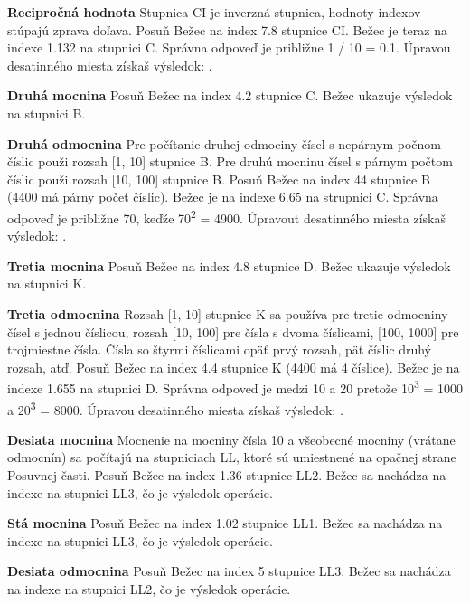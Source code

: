 \begin{multicols*}{3}
{  \textbf{Recipročná hodnota}
\footnotesize Stupnica CI je inverzná stupnica, hodnoty indexov stúpajú zprava doľava. \normalsize
Posuň Bežec na index 7.8 stupnice CI.
Bežec je teraz na indexe 1.132 na stupnici C.
Správna odpoveď je približne 1 / 10 = 0.1. Úpravou desatinného miesta získaš výsledok: .

  \textbf{Druhá mocnina}
Posuň Bežec na index 4.2 stupnice C.
Bežec ukazuje výsledok  na stupnici B.

  \textbf{Druhá odmocnina}
\footnotesize Pre počítanie druhej odmociny čísel s nepárnym počnom číslic použi rozsah [1, 10] stupnice B. Pre druhú mocninu čísel s párnym počtom číslic použi rozsah [10, 100] stupnice B. \normalsize
{}
Posuň Bežec na index 44 stupnice B (4400 má párny počet číslic).
Bežec je na indexe 6.65 na strupnici C. Správna odpoveď je približne 70, keďźe 70\textsuperscript{2} = 4900. Úpravout desatinného miesta získaš výsledok: .

  \textbf{Tretia mocnina}
Posuň Bežec na index 4.8 stupnice D.
Bežec ukazuje výsledok  na stupnici K.

  \textbf{Tretia odmocnina}
\footnotesize Rozsah [1, 10] stupnice K sa používa pre tretie odmocniny čísel s jednou číslicou, rozsah [10, 100] pre čísla s dvoma číslicami, [100, 1000] pre trojmiestne čísla. Čísla so štyrmi číslicami opäť prvý rozsah, päť číslic druhý rozsah, atď. \normalsize
{}
Posuň Bežec na index 4.4 stupnice K (4400 má 4 číslice).
Bežec je na indexe 1.655 na stupnici D.
Správna odpoveď je medzi 10 a 20 pretože 10\textsuperscript{3} = 1000 a 20\textsuperscript{3} = 8000. Úpravou desatinného miesta získaš výsledok: .

  \textbf{Desiata mocnina}
\footnotesize Mocnenie na mocniny čísla 10 a všeobecné mocniny (vrátane odmocnín) sa počítajú na stupniciach LL, ktoré sú umiestnené na opačnej strane Posuvnej časti. \normalsize
Posuň Bežec na index 1.36 stupnice LL2.
Bežec sa nachádza na indexe  na stupnici LL3, čo je výsledok operácie.

  \textbf{Stá mocnina}
Posuň Bežec na index 1.02 stupnice LL1.
Bežec sa nachádza na indexe  na stupnici LL3, čo je výsledok operácie.

  \textbf{Desiata odmocnina}
Posuň Bežec na index 5 stupnice LL3.
Bežec sa nachádza na indexe  na stupnici LL2, čo je výsledok operácie.

}
\end{multicols*}
